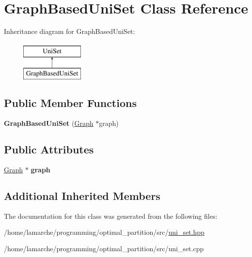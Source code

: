\hypertarget{classGraphBasedUniSet}{\section{Graph\-Based\-Uni\-Set Class Reference}
\label{classGraphBasedUniSet}
}
Inheritance diagram for Graph\-Based\-Uni\-Set\-:\begin{figure}[H]
\begin{center}
\leavevmode
\includegraphics[height=2.000000cm]{classGraphBasedUniSet}
\end{center}
\end{figure}
\subsection*{Public Member Functions}
\begin{DoxyCompactItemize}
\item 
\hypertarget{classGraphBasedUniSet_a5e38d30d91679e97038e6fa34bd54bea}{{\bfseries Graph\-Based\-Uni\-Set} (\hyperlink{classGraph}{Graph} $\ast$graph)}\label{classGraphBasedUniSet_a5e38d30d91679e97038e6fa34bd54bea}

\end{DoxyCompactItemize}
\subsection*{Public Attributes}
\begin{DoxyCompactItemize}
\item 
\hypertarget{classGraphBasedUniSet_a0d92dfbe2e0832dc635267283a4f525e}{\hyperlink{classGraph}{Graph} $\ast$ {\bfseries graph}}\label{classGraphBasedUniSet_a0d92dfbe2e0832dc635267283a4f525e}

\end{DoxyCompactItemize}
\subsection*{Additional Inherited Members}


The documentation for this class was generated from the following files\-:\begin{DoxyCompactItemize}
\item 
/home/lamarche/programming/optimal\-\_\-partition/src/\hyperlink{uni__set_8hpp}{uni\-\_\-set.\-hpp}\item 
/home/lamarche/programming/optimal\-\_\-partition/src/uni\-\_\-set.\-cpp\end{DoxyCompactItemize}
